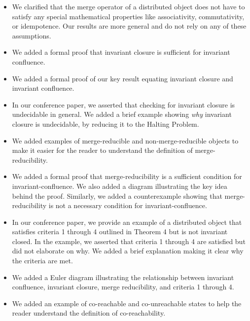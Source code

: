 \documentclass[12pt]{article}
\begin{document}
\begin{itemize}
  \item
    We clarified that the merge operator of a distributed object does not have
    to satisfy any special mathematical properties like associativity,
    commutativity, or idempotence. Our results are more general and do not rely
    on any of these assumptions.

  \item
    We added a formal proof that invariant closure is sufficient for invariant
    confluence.

  \item
    We added a formal proof of our key result equating invariant closure and
    invariant confluence.

  \item
    In our conference paper, we asserted that checking for invariant closure is
    undecidable in general. We added a brief example showing \emph{why}
    invariant closure is undecidable, by reducing it to the Halting Problem.

  \item
    We added examples of merge-reducible and non-merge-reducible objects to
    make it easier for the reader to understand the definition of
    merge-reducibility.

  \item
    We added a formal proof that merge-reducibility is a sufficient condition
    for invariant-confluence. We also added a diagram illustrating the key idea
    behind the proof. Similarly, we added a counterexample showing that
    merge-reducibility is not a necessary condition for invariant-confluence.

  \item
    In our conference paper, we provide an example of a distributed object that
    satisfies criteria 1 through 4 outlined in Theorem 4 but is not invariant
    closed. In the example, we asserted that criteria 1 through 4 are satisfied
    but did not elaborate on why. We added a brief explanation making it clear
    why the criteria are met.

  \item
    We added a Euler diagram illustrating the relationship between invariant
    confluence, invariant closure, merge reducibility, and criteria 1 through
    4.

  \item
    We added an example of co-reachable and co-unreachable states to help the
    reader understand the definition of co-reachability.


\end{itemize}
\end{document}

